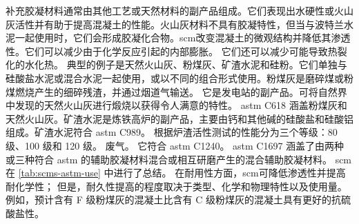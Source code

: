 补充胶凝材料通常由其他工艺或天然材料的副产品组成。它们表现出水硬性或火山灰活性并有助于提高混凝土的性能。火山灰材料不具有胶凝特性，但当与波特兰水泥一起使用时，它们会形成胶凝化合物。\acrlong*{scm}改变混凝土的微观结构并降低其渗透性。它们可以减少由于化学反应引起的内部膨胀。 它们还可以减少可能导致热裂化的水化热。 典型的例子是天然火山灰、粉煤灰、矿渣水泥和硅粉。它们单独与硅酸盐水泥或混合水泥一起使用，或以不同的组合形式使用。粉煤灰是磨碎煤或粉煤燃烧产生的细碎残渣，并通过烟道气输送。 它是发电站的副产品。可将自然界中发现的天然火山灰进行煅烧以获得令人满意的特性。 \acrshort*{astm} C618 涵盖粉煤灰和天然火山灰。矿渣水泥是炼铁高炉的副产品，主要由钙和其他碱的硅酸盐和硅酸铝组成。矿渣水泥符合 \acrshort*{astm} C989。 根据炉渣活性测试的性能分为三个等级：80 级、100 级和 120 级。 废气。 它符合 \acrshort*{astm} C1240。 \acrshort*{astm} C1697 涵盖了由两种或三种符合 \acrshort*{astm} 的辅助胶凝材料混合或相互研磨产生的混合辅助胶凝材料。 \acrlong*{scm}在 \cref{tab:scms-astm-use} 中进行了总结。 在耐用性方面，\acrlong*{scm}可降低渗透性并提高耐化学性； 但是，耐久性提高的程度取决于类型、化学和物理特性以及使用量。 例如，预计含有 F 级粉煤灰的混凝土比含有 C 级粉煤灰的混凝土具有更好的抗硫酸盐性。

